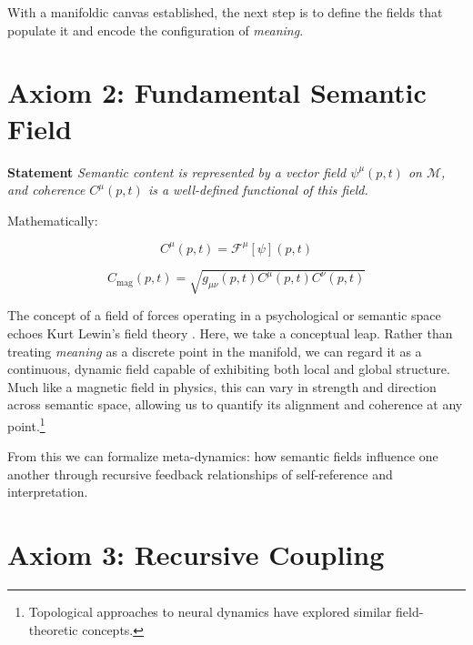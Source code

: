 With a manifoldic canvas established, the next step is to define the fields that populate it and encode the configuration of \textit{meaning}.


\section{Axiom 2: Fundamental Semantic Field}
\label{1.2:axiom_2_fundamental_semantic_field}

\textbf{Statement} \textit{Semantic content is represented by a vector field \(\psi^\mu(p,t)\) on \(\mathcal{M}\), and coherence \(C^\mu(p,t)\) is a well-defined functional of this field.}

Mathematically:

\begin{equation}
C^\mu(p,t) = \mathcal{F}^\mu[\psi](p,t)
\end{equation}

\begin{equation}
C_{\text{mag}}(p,t) = \sqrt{g_{\mu\nu}(p,t) C^\mu(p,t) C^\nu(p,t)}
\end{equation}

The concept of a field of forces operating in a psychological or semantic space echoes Kurt Lewin's field theory \autocite{Lewin1951}. Here, we take a conceptual leap. Rather than treating \textit{meaning} as a discrete point in the manifold, we can regard it as a continuous, dynamic field capable of exhibiting both local and global structure. Much like a magnetic field in physics, this can vary in strength and direction across semantic space, allowing us to quantify its alignment and coherence at any point.\footnote{Topological approaches to neural dynamics \autocite{Bassett2018, Petri2014} have explored similar field-theoretic concepts.}

From this we can formalize meta-dynamics: how semantic fields influence one another through recursive feedback relationships of self-reference and interpretation.


\section{Axiom 3: Recursive Coupling}
\label{1.3:axiom_3_recursive_coupling}


